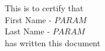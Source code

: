 \documentclass[12pt]{article}
\begin{document}
	This is to certify that \\
	First Name - $PARAM$\\
	Last Name - $PARAM$\\
	has written this document
\end{document}
